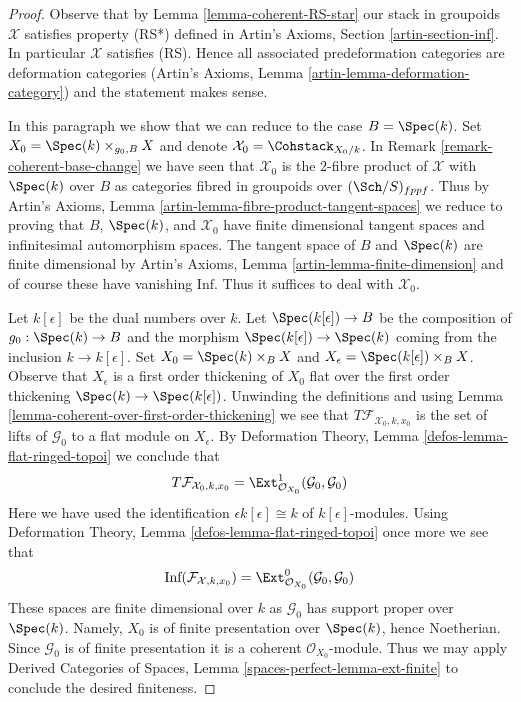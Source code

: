 \begin{proof}
Observe that by Lemma \ref{lemma-coherent-RS-star}
our stack in groupoids $\mathcal{X}$ satisfies property (RS*)
defined in Artin's Axioms, Section \ref{artin-section-inf}.
In particular $\mathcal{X}$ satisfies (RS).
Hence all associated predeformation
categories are deformation categories
(Artin's Axioms, Lemma \ref{artin-lemma-deformation-category})
and the statement makes sense.

\medskip\noindent
In this paragraph we show that we can reduce to the case $B = \Spec(k)$.
Set $X_0 = \Spec(k) \times_{g_0, B} X$
and denote $\mathcal{X}_0 = \Cohstack_{X_0/k}$. In
Remark \ref{remark-coherent-base-change} we have seen that
$\mathcal{X}_0$ is the $2$-fibre product of $\mathcal{X}$ with
$\Spec(k)$ over $B$ as categories fibred in groupoids over
$(\Sch/S)_{fppf}$. Thus by
Artin's Axioms, Lemma \ref{artin-lemma-fibre-product-tangent-spaces}
we reduce to proving that $B$, $\Spec(k)$, and $\mathcal{X}_0$
have finite dimensional tangent spaces and infinitesimal automorphism
spaces. The tangent space of $B$ and $\Spec(k)$ are finite dimensional by
Artin's Axioms, Lemma \ref{artin-lemma-finite-dimension}
and of course these have vanishing $\text{Inf}$.
Thus it suffices to deal with $\mathcal{X}_0$.

\medskip\noindent
Let $k[\epsilon]$ be the dual numbers over $k$.
Let $\Spec(k[\epsilon]) \to B$ be the composition of $g_0 : \Spec(k) \to B$
and the morphism $\Spec(k[\epsilon]) \to \Spec(k)$
coming from the inclusion $k \to k[\epsilon]$.
Set $X_0 = \Spec(k) \times_B X$ and
$X_\epsilon = \Spec(k[\epsilon]) \times_B X$.
Observe that $X_\epsilon$ is a first order thickening of $X_0$
flat over the first order thickening $\Spec(k) \to \Spec(k[\epsilon])$.
Unwinding the definitions and using
Lemma \ref{lemma-coherent-over-first-order-thickening}
we see that $T\mathcal{F}_{\mathcal{X}_0, k, x_0}$ is the set of
lifts of $\mathcal{G}_0$ to a flat module on $X_\epsilon$.
By Deformation Theory, Lemma \ref{defos-lemma-flat-ringed-topoi}
we conclude that
$$
T\mathcal{F}_{\mathcal{X}_0, k, x_0} =
\Ext^1_{\mathcal{O}_{X_0}}(\mathcal{G}_0, \mathcal{G}_0)
$$
Here we have used the identification $\epsilon k[\epsilon] \cong k$
of $k[\epsilon]$-modules. Using
Deformation Theory, Lemma \ref{defos-lemma-flat-ringed-topoi}
once more we see that
$$
\text{Inf}(\mathcal{F}_{\mathcal{X}, k, x_0}) =
\Ext^0_{\mathcal{O}_{X_0}}(\mathcal{G}_0, \mathcal{G}_0)
$$
These spaces are finite dimensional over $k$ as $\mathcal{G}_0$
has support proper over $\Spec(k)$. Namely, $X_0$ is of finite presentation
over $\Spec(k)$, hence Noetherian. Since $\mathcal{G}_0$ is of finite
presentation it is a coherent $\mathcal{O}_{X_0}$-module. Thus we may apply
Derived Categories of Spaces, Lemma
\ref{spaces-perfect-lemma-ext-finite}
to conclude the desired finiteness.
\end{proof}

